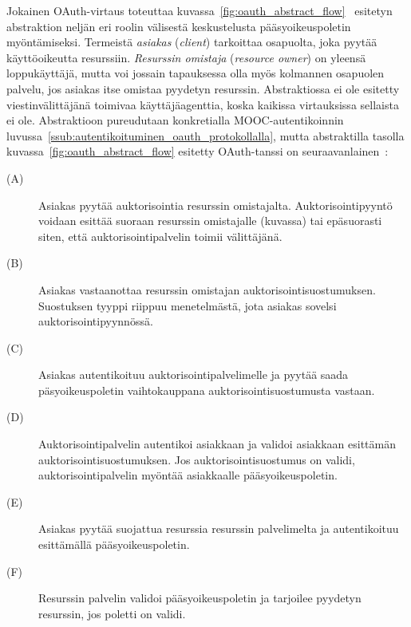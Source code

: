 \documentclass[finnish,gradu]{tktltiki}
\begin{document}
  Jokainen OAuth-virtaus toteuttaa kuvassa~\ref{fig:oauth_abstract_flow}~\cite{ietf_oauth2} esitetyn abstraktion neljän eri roolin välisestä keskustelusta pääsyoikeuspoletin myöntämiseksi. Termeistä \emph{asiakas} (\emph{client}) tarkoittaa osapuolta, joka pyytää käyttöoikeutta resurssiin. \emph{Resurssin omistaja} (\emph{resource owner}) on yleensä loppukäyttäjä, mutta voi jossain tapauksessa olla myös kolmannen osapuolen palvelu, jos asiakas itse omistaa pyydetyn resurssin. Abstraktiossa ei ole esitetty viestinvälittäjänä toimivaa käyttäjäagenttia, koska kaikissa virtauksissa sellaista ei ole. Abstraktioon pureudutaan konkretialla MOOC-autentikoinnin luvussa~\ref{ssub:autentikoituminen_oauth_protokollalla}, mutta abstraktilla tasolla kuvassa~\ref{fig:oauth_abstract_flow} esitetty OAuth-tanssi on seuraavanlainen~\cite{ietf_oauth2}:

  \begin{description}
    \item[(A)]
      Asiakas pyytää auktorisointia resurssin omistajalta. Auktorisointipyyntö voidaan esittää suoraan resurssin omistajalle (kuvassa) tai epäsuorasti siten, että auktorisointipalvelin toimii välittäjänä.

    \item[(B)]
      Asiakas vastaanottaa resurssin omistajan auktorisointisuostumuksen. Suostuksen tyyppi riippuu menetelmästä, jota asiakas sovelsi auktorisointipyynnössä.

    \item[(C)]
      Asiakas autentikoituu auktorisointipalvelimelle ja pyytää saada päsyoikeuspoletin vaihtokauppana auktorisointisuostumusta vastaan.

    \item[(D)]
      Auktorisointipalvelin autentikoi asiakkaan ja validoi asiakkaan esittämän auktorisointisuostumuksen. Jos auktorisointisuostumus on validi, auktorisointipalvelin myöntää asiakkaalle pääsyoikeuspoletin.

    \item[(E)]
      Asiakas pyytää suojattua resurssia resurssin palvelimelta ja autentikoituu esittämällä pääsyoikeuspoletin.

    \item[(F)]
      Resurssin palvelin validoi pääsyoikeuspoletin ja tarjoilee pyydetyn resurssin, jos poletti on validi.
  \end{description}
\end{document}
